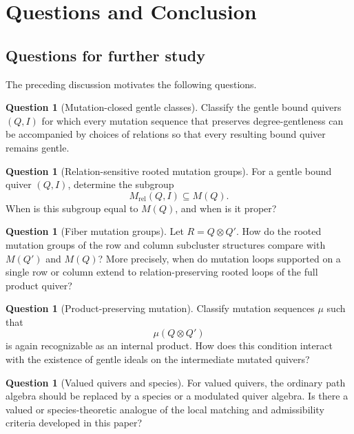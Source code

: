 \documentclass[11pt]{article}
\theoremstyle{plain}
\theoremstyle{definition}
\newtheorem{question}[theorem]{Question}
\theoremstyle{remark}
\begin{document}
\section{Questions and Conclusion}

\subsection{Questions for further study}

The preceding discussion motivates the following questions.

\begin{question}[Mutation-closed gentle classes]
Classify the gentle bound quivers \((Q,I)\) for which every mutation sequence
that preserves degree-gentleness can be accompanied by choices of relations so
that every resulting bound quiver remains gentle.
\end{question}

\begin{question}[Relation-sensitive rooted mutation groups]
For a gentle bound quiver \((Q,I)\), determine the subgroup
\[
  M_{\mathrm{rel}}(Q,I)\subseteq M(Q).
\]
When is this subgroup equal to \(M(Q)\), and when is it proper?
\end{question}

\begin{question}[Fiber mutation groups]
Let \(R=Q\otimes Q'\).  How do the rooted mutation groups of the row and
column subcluster structures compare with \(M(Q')\) and \(M(Q)\)?  More
precisely, when do mutation loops supported on a single row or column extend
to relation-preserving rooted loops of the full product quiver?
\end{question}

\begin{question}[Product-preserving mutation]
Classify mutation sequences \(\mu\) such that
\[
  \mu(Q\otimes Q')
\]
is again recognizable as an internal product.  How does this condition interact
with the existence of gentle ideals on the intermediate mutated quivers?
\end{question}

\begin{question}[Valued quivers and species]
For valued quivers, the ordinary path algebra should be replaced by a species
or a modulated quiver algebra.  Is there a valued or species-theoretic analogue
of the local matching and admissibility criteria developed in this paper?
\end{question}
\end{document}
